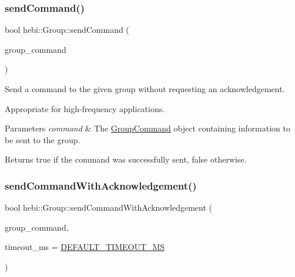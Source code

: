 \subsubsection{\texorpdfstring{send\+Command()}{sendCommand()}}
{\footnotesize\ttfamily bool hebi\+::\+Group\+::send\+Command (\begin{DoxyParamCaption}\item[{const \hyperlink{classhebi_1_1GroupCommand}{Group\+Command} \&}]{group\+\_\+command }\end{DoxyParamCaption})}



Send a command to the given group without requesting an acknowledgement. 

Appropriate for high-\/frequency applications.


\begin{DoxyParams}{Parameters}
{\em command} & The \hyperlink{classhebi_1_1GroupCommand}{Group\+Command} object containing information to be sent to the group.\\
\hline
\end{DoxyParams}
\begin{DoxyReturn}{Returns}
true if the command was successfully sent, false otherwise. 
\end{DoxyReturn}
\mbox{\label{classhebi_1_1Group_a992aad2873e2d108c2d4deb3f824a538}} 
\subsubsection{\texorpdfstring{send\+Command\+With\+Acknowledgement()}{sendCommandWithAcknowledgement()}}
{\footnotesize\ttfamily bool hebi\+::\+Group\+::send\+Command\+With\+Acknowledgement (\begin{DoxyParamCaption}\item[{const \hyperlink{classhebi_1_1GroupCommand}{Group\+Command} \&}]{group\+\_\+command,  }\item[{int}]{timeout\+\_\+ms = {\ttfamily \hyperlink{classhebi_1_1Group_a3d01ca6dbd28ec984cda196a77056dd4}{D\+E\+F\+A\+U\+L\+T\+\_\+\+T\+I\+M\+E\+O\+U\+T\+\_\+\+MS}} }\end{DoxyParamCaption})}



